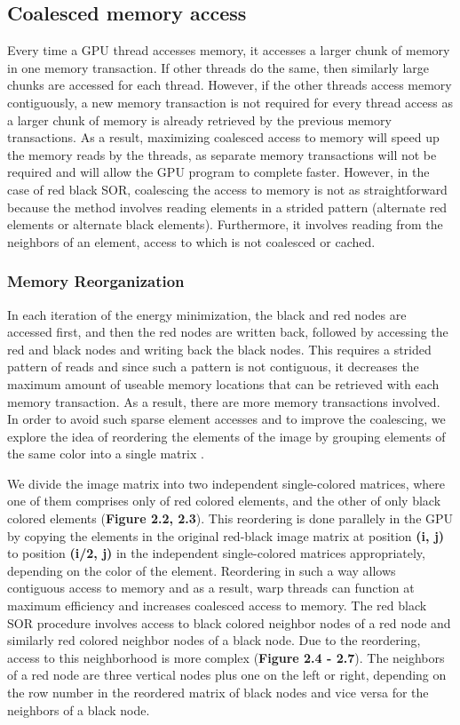 \documentclass[english]{article}
\begin{document}
	\subsection{Coalesced memory access}
	Every time a GPU thread accesses memory, it accesses a larger chunk of memory in one memory transaction. If other threads do the same, then similarly large chunks are accessed for each thread. However, if the other threads access memory contiguously, a new memory transaction is not required for every thread access as a larger chunk of memory is already retrieved by the previous memory transactions. As a result, maximizing coalesced access to memory will speed up the memory reads by the threads, as separate memory transactions will not be required and will allow the GPU program to complete faster. However, in the case of red black SOR, coalescing the access to memory is not as straightforward because the method involves reading elements in a strided pattern (alternate red elements or alternate black elements). Furthermore, it involves reading from the neighbors of an element, access to which is not coalesced or cached.

	\subsubsection{Memory Reorganization}
	In each iteration of the energy minimization, the black and red nodes are accessed first, and then the red nodes are written back, followed by accessing the red and black nodes and writing back the black nodes. This requires a strided pattern of reads and since such a pattern is not contiguous, it decreases the maximum amount of useable memory locations that can be retrieved with each memory transaction. As a result, there are more memory transactions involved. In order to avoid such sparse element accesses and to improve the coalescing, we explore the idea of reordering the elements of the image by grouping elements of the same color into a single matrix \cite{2}.\newline

	We divide the image matrix into two independent single-colored matrices, where one of them comprises only of red colored elements, and the other of only black colored elements (\textbf{Figure 2.2, 2.3}). This reordering is done parallely in the GPU by copying the elements in the original red-black image matrix at position \textbf{(i, j)} to position \textbf{(i/2, j)} in the independent single-colored matrices appropriately, depending on the color of the element. Reordering in such a way allows contiguous access to memory and as a result, warp threads can function at maximum efficiency and increases coalesced access to memory. The red black SOR procedure involves access to black colored neighbor nodes of a red node and similarly red colored neighbor nodes of a black node. Due to the reordering, access to this neighborhood is more complex (\textbf{Figure 2.4 - 2.7}). The neighbors of a red node are three vertical nodes plus one on the left or right, depending on the row number in the reordered matrix of black nodes and vice versa for the neighbors of a black node.
\end{document}
